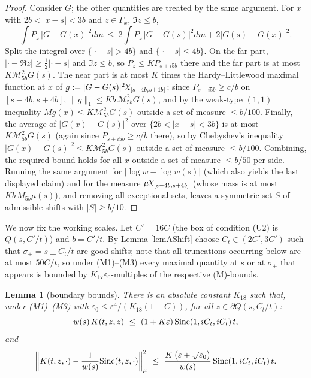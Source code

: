 \documentclass[11pt,twoside,reqno]{amsart}
\def\pa{\partial}
\def\MM{{\mathcal M}}
\def\e{\varepsilon}
\def\G{\Gamma}
\def\s{\sigma}
\newcommand{\charf}{\raisebox{\depth}{\(\chi\)}}
\def\S{\text{\rm Sinc}}
\theoremstyle{plain}
\newtheorem{lemma}{Lemma}
\numberwithin{equation}{section}
\begin{document}
\begin{proof}
Consider $G$; the other quantities are treated by the same argument. For $x$ with $2b<|x-s|<3b$ and $z\in\G_x$, $\Im z\leq b$,
$$\int P_z\,|G-G(x)|^2dm\ \leq\ 2\int P_z\,|G-G(s)|^2dm+2|G(s)-G(x)|^2 .$$
Split the integral over $\{|\cdot-s|>4b\}$ and $\{|\cdot-s|\leq4b\}$. On the far part, $|\cdot-\Re z|\geq\frac12|\cdot-s|$ and $\Im z\leq b$, so $P_z\leq KP_{s+i5b}$ there and the far part is at most $K\MM^2_{5b}G(s)$. The near part is at most $K$ times the Hardy--Littlewood maximal function at $x$ of $g:=|G-G(s)|^2\charf_{[s-4b,s+4b]}$; since $P_{s+i5b}\geq c/b$ on $[s-4b,s+4b]$, $\|g\|_1\leq Kb\,\MM^2_{5b}G(s)$, and by the weak-type $(1,1)$ inequality $Mg(x)\leq K\MM^2_{5b}G(s)$ outside a set of measure $\leq b/100$. Finally, the average of $|G(x)-G(s)|^2$ over $\{2b<|x-s|<3b\}$ is at most $K\MM^2_{5b}G(s)$ (again since $P_{s+i5b}\geq c/b$ there), so by Chebyshev's inequality $|G(x)-G(s)|^2\leq K\MM^2_{5b}G(s)$ outside a set of measure $\leq b/100$. Combining, the required bound holds for all $x$ outside a set of measure $\leq b/50$ per side. Running the same argument for $|\log w-\log w(s)|$ (which also yields the last displayed claim) and for the measure $\mu\charf_{[s-4b,s+4b]}$ (whose mass is at most $Kb\,M_{5b}\mu(s)$), and removing all exceptional sets, leaves a symmetric set $S$ of admissible shifts with $|S|\geq b/10$.
\end{proof}

We now fix the working scales. Let $C'=16C$ (the box of condition (U2) is $Q(s,C'/t)$) and $b=C'/t$. By Lemma \ref{lemAShift} choose $C_t\in(2C',3C')$ such that $\s_\pm=s\pm C_t/t$ are good shifts; note that all truncations occurring below are at most $50C/t$, so under (M1)--(M3) every maximal quantity at $s$ or at $\s_\pm$ that appears is bounded by $K_{17}\e_0$-multiples of the respective (M)-bounds.

\begin{lemma}[boundary bounds]\label{lemAL2}
There is an absolute constant $K_{18}$ such that, under {\rm(M1)--(M3)} with $\e_0\leq\e^4/\left(K_{18}(1+C)\right)$, for all $z\in\pa Q(s,C_t/t)$:
$$w(s)\,K(t,z,z)\ \leq\ (1+K\e)\,\S(1,iC_t,iC_t)\,t,$$
and
$$\left\|K(t,z,\cdot)-\frac1{w(s)}\S(t,z,\cdot)\right\|^2_\mu\ \leq\ \frac{K\left(\e+\sqrt{\e_0}\right)}{w(s)}\,\S(1,iC_t,iC_t)\,t .$$
\end{lemma}
\end{document}
